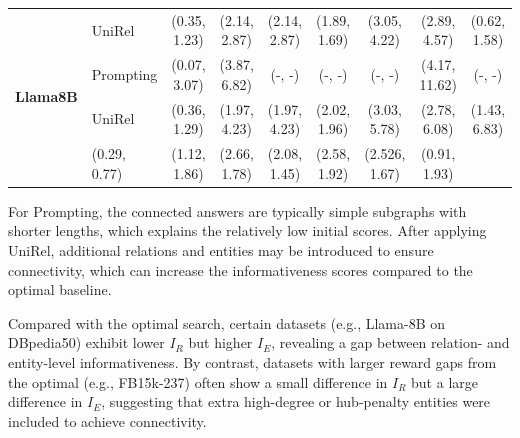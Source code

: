 \begin{table}[ht]
{\begin{tabular}{llccccccc}
& UniRel  & (0.35, 1.23) & (2.14, 2.87) & (2.14, 2.87) & (1.89, 1.69) & (3.05, 4.22) & (2.89, 4.57) & (0.62, 1.58) \\ 
\multirow{2}{*}{\textbf{Llama8B}}         
& Prompting    & (0.07, 3.07) & (3.87, 6.82) & (-, -) & (-, -) & (-, -) & (4.17, 11.62) & (-, -) \\
& UniRel  & (0.36, 1.29) & (1.97, 4.23) & (1.97, 4.23) & (2.02, 1.96) & (3.03, 5.78) & (2.78, 6.08) & (1.43, 6.83) \\ 
\midrule
\rowcolor{blue!10}
\multicolumn{2}{l}{\textbf{Optimal Search}} 
& (0.29, 0.77) & (1.12, 1.86) & (2.66, 1.78) & (2.08, 1.45) & (2.58, 1.92) & (2.526, 1.67) & (0.91, 1.93) \\
\bottomrule
\end{tabular}
}
\label{tab:main_additional_results}
\end{table}

For Prompting, the connected answers are typically simple subgraphs with shorter lengths, which explains the relatively low initial scores. After applying UniRel, additional relations and entities may be introduced to ensure connectivity, which can increase the informativeness scores compared to the optimal baseline.

Compared with the optimal search, certain datasets (e.g., Llama-8B on DBpedia50) exhibit lower $I_R$ but higher $I_E$, revealing a gap between relation- and entity-level informativeness. By contrast, datasets with larger reward gaps from the optimal (e.g., FB15k-237) often show a small difference in $I_R$ but a large difference in $I_E$, suggesting that extra high-degree or hub-penalty entities were included to achieve connectivity.

